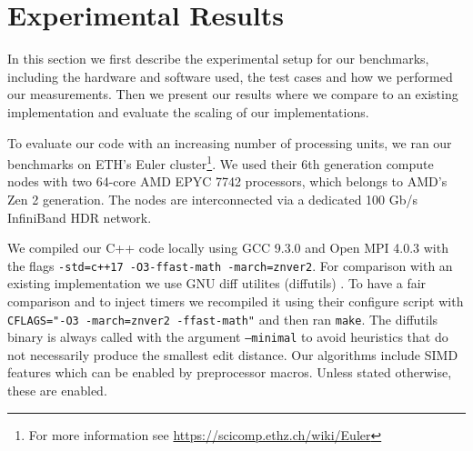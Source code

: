 
\section{Experimental Results}\label{sec:exp}

In this section we first describe the experimental setup for our benchmarks, including the hardware and software used, the test cases and how we performed our measurements. Then we present our results where we compare to an existing implementation and evaluate the scaling of our implementations.

To evaluate our code with an increasing number of processing units, we ran our benchmarks on ETH's Euler cluster\footnote{For more information see \url{https://scicomp.ethz.ch/wiki/Euler}}. We used their 6th generation compute nodes with two 64-core AMD EPYC 7742 processors, which belongs to AMD's Zen 2 generation. The nodes are interconnected via a dedicated 100 Gb/s InfiniBand HDR network.

We compiled our C++ code locally using GCC 9.3.0 and Open MPI 4.0.3 with the flags \texttt{-std=c++17 -O3\linebreak -ffast-math \linebreak[1]-march=znver2}. For comparison with an existing implementation we use GNU diff utilites (diffutils) \cite{diffutils}. To have a fair comparison and to inject timers we recompiled it using their configure script with \texttt{CFLAGS=\linebreak[4]"-O3 -march=znver2 -ffast-math"} and then ran \texttt{make}. The diffutils binary is always called with the argument \texttt{--minimal} to avoid heuristics that do not necessarily produce the smallest edit distance. Our algorithms include SIMD features which can be enabled by preprocessor macros. Unless stated otherwise, these are enabled.

